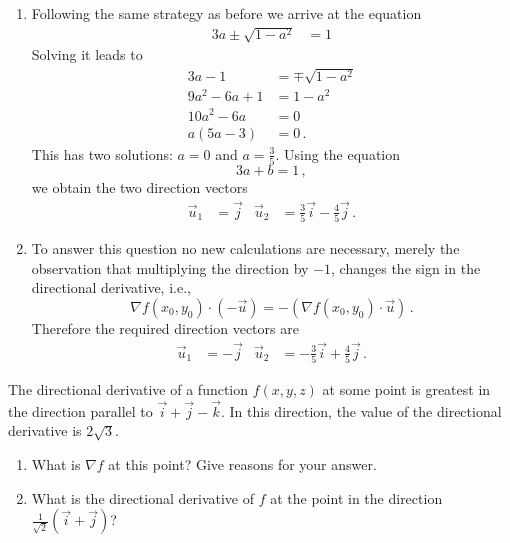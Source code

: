 \begin{solution}
\begin{enumerate}
\item
Following the same strategy as before we arrive at the equation
\begin{align*}
3a \pm \sqrt{1-a^2} &= 1
\end{align*}
Solving it leads to
\begin{align*}
3a-1 &= \mp \sqrt{1-a^2} \\
9a^2 -6a + 1 &= 1 - a^2 \\
10a^2 - 6a &= 0 \\
a(5a-3) &= 0\,.
\end{align*}
This has two solutions: $a=0$ and $a=\frac 35$. Using the equation
\[
3a+b=1\,,
\]
we obtain the two direction vectors
\begin{align*}
\vec u_1 &= \vec j &
\vec u_2 &= \frac 35 \vec i -\frac 45 \vec j\,.
\end{align*}

\item
To answer this question no new calculations are necessary, merely the observation that multiplying the direction by $-1$, changes the sign in the directional derivative, i.e.,
\[
\nabla f(x_0,y_0) \cdot (-\vec u) = - \left( \nabla f(x_0, y_0) \cdot \vec u \right)\,.
\]
Therefore the required direction vectors are
\begin{align*}
\vec u_1 &= -\vec j &
\vec u_2 &= -\frac 35 \vec i +\frac 45 \vec j\,.
\end{align*}
\end{enumerate}
\end{solution}

\begin{question}
The directional derivative of a function $f(x,y,z)$ at some point is greatest in the direction parallel to $\vec i + \vec j - \vec k$. In this direction, the value of the directional derivative is $2\sqrt{3}$.
\begin{enumerate}
\item
What is $\nabla f$ at this point? Give reasons for your answer.
\item
What is the directional derivative of $f$ at the point in the direction $\frac{1}{\sqrt 2}\left(\vec i + \vec j\right)$?
\end{enumerate}
\end{question}

